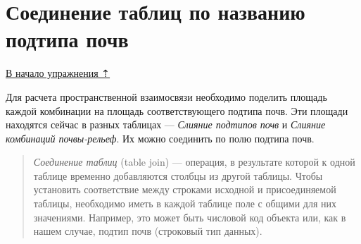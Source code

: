 \documentclass[
  12pt,
]{book}
\begin{document}
\hypertarget{overlay-join}{%
\section{Соединение таблиц по названию подтипа почв}\label{overlay-join}}

\protect\hyperlink{overlay}{В начало упражнения ⇡}

Для расчета пространственной взаимосвязи необходимо поделить площадь каждой комбинации на площадь соответствующего подтипа почв. Эти площади находятся сейчас в разных таблицах --- \emph{Слияние подтипов почв} и \emph{Слияние комбинаций почвы-рельеф}. Их можно соединить по полю подтипа почв.

\begin{quote}
\emph{Соединение таблиц} (table join) --- операция, в результате которой к одной таблице временно добавляются столбцы из другой таблицы. Чтобы установить соответствие между строками исходной и присоединяемой таблицы, необходимо иметь в каждой таблице поле с общими для них значениями. Например, это может быть числовой код объекта или, как в нашем случае, подтип почв (строковый тип данных).
\end{quote}
\end{document}
